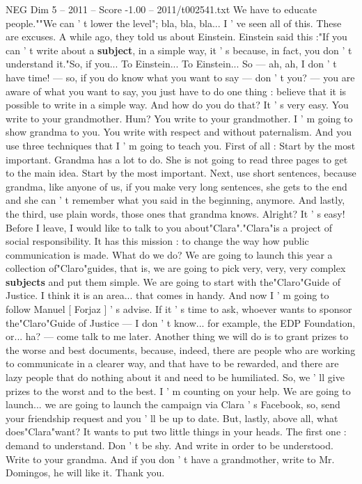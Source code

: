 \begin{textsample}{NEG Dim 5 – 2011 – Score -1.00 – 2011/t002541.txt}
We have to educate people.""We can ' t lower the level"; bla, bla, bla...
I ' ve seen all of this.
These are excuses.
A while ago, they told us about Einstein.
Einstein said this :"If you can ' t write about a \textbf{subject}, in a simple way, it ' s because, in fact, you don ' t understand it."So, if you...
To Einstein...
To Einstein...
So — ah, ah, I don ' t have time! — so, if you do know what you want to say — don ' t you? — you are aware of what you want to say, you just have to do one thing : believe that it is possible to write in a simple way.
And how do you do that?
It ' s very easy.
You write to your grandmother.
Hum?
You write to your grandmother.
I ' m going to show grandma to you.
You write with respect and without paternalism.
And you use three techniques that I ' m going to teach you.
First of all : Start by the most important.
Grandma has a lot to do.
She is not going to read three pages to get to the main idea.
Start by the most important.
Next, use short sentences, because grandma, like anyone of us, if you make very long sentences, she gets to the end and she can ' t remember what you said in the beginning, anymore.
And lastly, the third, use plain words, those ones that grandma knows.
Alright?
It ' s easy!
Before I leave, I would like to talk to you about"Clara"."Clara"is a project of social responsibility.
It has this mission : to change the way how public communication is made.
What do we do?
We are going to launch this year a collection of"Claro"guides, that is, we are going to pick very, very, very complex \textbf{subjects} and put them simple.
We are going to start with the"Claro"Guide of Justice.
I think it is an area... that comes in handy.
And now I ' m going to follow Manuel [ Forjaz ] ' s advise.
If it ' s time to ask, whoever wants to sponsor the"Claro"Guide of Justice — I don ' t know... for example, the EDP Foundation, or... ha? — come talk to me later.
Another thing we will do is to grant prizes to the worse and best documents, because, indeed, there are people who are working to communicate in a clearer way, and that have to be rewarded, and there are lazy people that do nothing about it and need to be humiliated.
So, we ' ll give prizes to the worst and to the best.
I ' m counting on your help.
We are going to launch... we are going to launch the campaign via Clara ' s Facebook, so, send your friendship request and you ' ll be up to date.
But, lastly, above all, what does"Clara"want?
It wants to put two little things in your heads.
The first one : demand to understand.
Don ' t be shy.
And write in order to be understood.
Write to your grandma.
And if you don ' t have a grandmother, write to Mr.
Domingos, he will like it.
Thank you.

\end{textsample}
